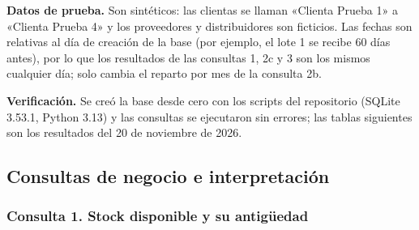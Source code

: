 \documentclass[11pt,letterpaper]{article}
\begin{document}
\textbf{Datos de prueba.} Son sintéticos: las clientas se llaman «Clienta Prueba 1» a «Clienta Prueba 4» y los proveedores y distribuidores son ficticios. Las fechas son relativas al día de creación de la base (por ejemplo, el lote 1 se recibe 60 días antes), por lo que los resultados de las consultas 1, 2c y 3 son los mismos cualquier día; solo cambia el reparto por mes de la consulta 2b.

\textbf{Verificación.} Se creó la base desde cero con los scripts del repositorio (SQLite 3.53.1, Python 3.13) y las consultas se ejecutaron sin errores; las tablas siguientes son los resultados del 20 de noviembre de 2026.

\subsection{Consultas de negocio e interpretación}

\subsubsection*{Consulta 1. Stock disponible y su antigüedad}
\end{document}
